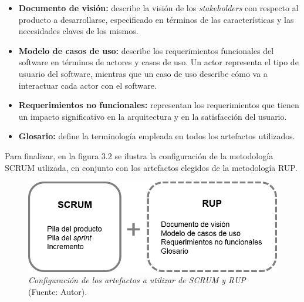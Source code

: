 		\begin{itemize}
			\item \textbf{Documento de visi\'{o}n: }describe la visi\'{o}n de los \textit{stakeholders} con respecto al producto a desarrollarse, especificado en t\'{e}rminos de las caracter\'{i}sticas y las necesidades claves de los mismos.
			
			\item \textbf{Modelo de casos de uso: }describe los requerimientos funcionales del software en t\'{e}rminos de actores y casos de uso. Un actor representa el tipo de usuario del software, mientras que un caso de uso describe c\'{o}mo va a interactuar cada actor con el software.
			
			\item \textbf{Requerimientos no funcionales: } representan los requerimientos que tienen un impacto significativo en la arquitectura y en la satisfacci\'{o}n del usuario.
			
			\item \textbf{Glosario: }define la terminolog\'{i}a empleada en todos los artefactos utilizados.
		\end{itemize}

\newpage

Para finalizar, en la figura 3.2 se ilustra la configuraci\'{o}n de la metodolog\'{i}a SCRUM utlizada, en conjunto con los artefactos elegidos de la metodolog\'{i}a RUP.
	
	\FloatBarrier
	\begin{figure}[h]
		\centering
		\includegraphics[scale=0.8]{img/SCRUM-RUP.png}
			\caption[Configuraci\'{o}n de los artefactos a utilizar de SCRUM y RUP]{\textit{Configuraci\'{o}n de los artefactos a utilizar de SCRUM y RUP} (Fuente: Autor).}
	\end{figure}
	\FloatBarrier
	